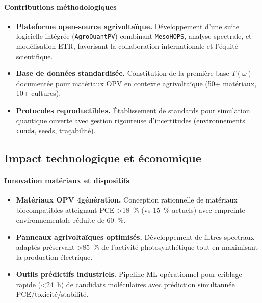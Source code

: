 \documentclass[12pt, a4paper]{article}
\begin{document}
\paragraph{Contributions méthodologiques}
\begin{itemize}
    \item \textbf{Plateforme open-source agrivoltaïque.} Développement d'une suite logicielle intégrée (\texttt{AgroQuantPV}) combinant \texttt{MesoHOPS}, analyse spectrale, et modélisation ETR, favorisant la collaboration internationale et l'équité scientifique.

    \item \textbf{Base de données standardisée.} Constitution de la première base $T(\omega)$ documentée pour matériaux OPV en contexte agrivoltaïque (50+ matériaux, 10+ cultures).

    \item \textbf{Protocoles reproductibles.} Établissement de standards pour simulation quantique ouverte avec gestion rigoureuse d'incertitudes (environnements \texttt{conda}, seeds, traçabilité).
\end{itemize}

\subsection{Impact technologique et économique}

\paragraph{Innovation matériaux et dispositifs}
\begin{itemize}
    \item \textbf{Matériaux OPV 4\ieme génération.} Conception rationnelle de matériaux biocompatibles atteignant PCE \SI{>18}{\percent} (vs \SI{15}{\percent} actuels) avec empreinte environnementale réduite de \SI{60}{\percent}.
    
    \item \textbf{Panneaux agrivoltaïques optimisés.} Développement de filtres spectraux adaptés préservant \SI{>85}{\percent} de l'activité photosynthétique tout en maximisant la production électrique.
    
    \item \textbf{Outils prédictifs industriels.} Pipeline ML opérationnel pour criblage rapide (\SI{<24}{\hour}) de candidats moléculaires avec prédiction simultannée PCE/toxicité/stabilité.
\end{itemize}
\end{document}
